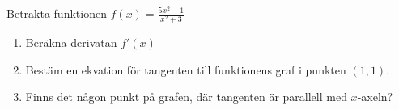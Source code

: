 Betrakta funktionen $ f(x)  = \frac{5x^2-1}{x^2+3} $
\begin{enumerate}
\item Beräkna derivatan $f'(x)$
\item Bestäm en ekvation för tangenten till funktionens graf i punkten $(1,1)$.
\item Finns det någon punkt på grafen, där tangenten är parallell med $x$-axeln?
\end{enumerate}
